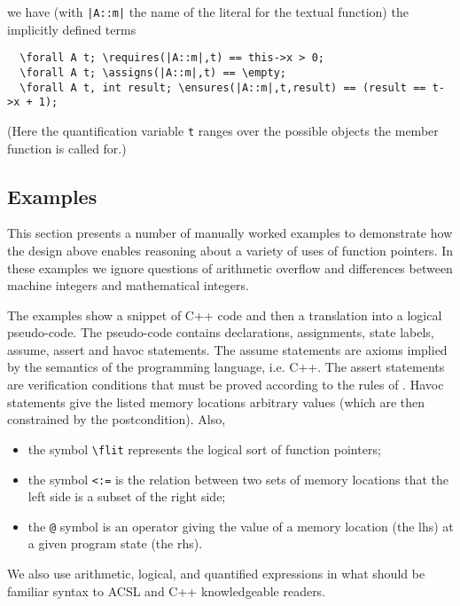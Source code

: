 

we have (with \lstinline+|A::m|+ the name of the literal for the textual
function) the implicitly defined terms

\begin{lstlisting}
  \forall A t; \requires(|A::m|,t) == this->x > 0;
  \forall A t; \assigns(|A::m|,t) == \empty;
  \forall A t, int result; \ensures(|A::m|,t,result) == (result == t->x + 1);
\end{lstlisting}
(Here the quantification variable \lstinline|t| ranges over the possible
objects the member function is called for.)

\subsection{Examples}
\label{sec:fpexamples}

This section presents a number of manually worked examples 
to demonstrate how the design above enables reasoning about
a variety of uses of function pointers.
In these examples we ignore questions of arithmetic overflow and 
differences between machine integers and mathematical integers.

The examples show a snippet of C++ code and then a translation into a logical
pseudo-code. The pseudo-code contains declarations, assignments, state labels, assume, assert and havoc statements. 
The assume statements are axioms implied by the semantics of the
programming language, i.e. C++. 
The assert statements are verification conditions that
must be proved according to the rules of \NAME.
Havoc statements give the listed memory locations arbitrary values (which are then constrained by the postcondition). Also,
\begin{itemize}[noitemsep,nolistsep]
	\item the symbol \lstinline|\flit| represents the logical sort of function pointers;
	\item the symbol \lstinline|<:=| is the relation between two sets of memory locations that the left side is a subset of the right side;
	\item the \lstinline|@| symbol is an operator giving the value of a memory location (the lhs) at a given program state (the rhs).
\end{itemize}

We also use arithmetic, logical, and quantified expressions in what should be familiar syntax to ACSL and C++ knowledgeable readers.

